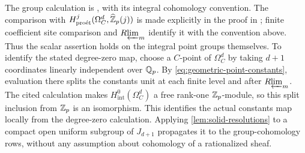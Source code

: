 The group calculation is \cite[Theorem~1.1]{CDN2021}, with its integral
cohomology convention.  The comparison with
$H^j_{\mathrm{pro\acute et}}(\Omega_C^d,\widehat{\mathbb Z}_p(j))$
is made explicitly in the proof in \cite[\S5]{CDN2021}; finite
coefficient site comparison and $R\!\varprojlim_m$ identify it with the
convention above.  Thus the scalar assertion holds on the
integral point groups themselves.  To identify the stated degree-zero
map, choose a $C$-point of $\Omega_C^d$ by taking $d+1$ coordinates
linearly independent over $\mathbb Q_p$.  By
\eqref{eq:geometric-point-constants}, evaluation there splits the
constants unit at each finite level and after $R\!\varprojlim_m$.  The cited
calculation makes $H^0_{\mathrm{int}}(\Omega_C^d)$ a free rank-one
$\mathbb Z_p$-module, so this split inclusion from $\mathbb Z_p$ is an isomorphism.
This identifies the actual constants map locally from the degree-zero
calculation.  Applying
\cref{lem:solid-resolutions} to a compact open uniform subgroup
of $J_{d+1}$ propagates it to the group-cohomology rows, without
any assumption about cohomology of a rationalized sheaf.
